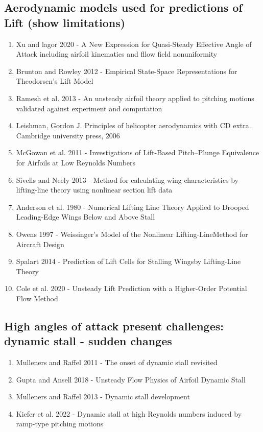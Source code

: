 \documentclass[%
 reprint,
 amsmath,amssymb,
 aps,
]{revtex4-2}
\begin{document}
\subsection{Aerodynamic models used for predictions of Lift (show limitations)}
\begin{enumerate}
    \item Xu and lagor 2020 - A New Expression for Quasi-Steady Effective Angle of Attack including airfoil kinematics and fllow field nonuniformity
    \item Brunton and Rowley 2012 - Empirical State-Space Representations
for Theodorsen’s Lift Model
    \item Ramesh et al. 2013 - An unsteady airfoil theory applied to pitching motions
validated against experiment and computation
    \item Leishman, Gordon J. Principles of helicopter aerodynamics with CD extra. Cambridge university press, 2006
    \item McGowan et al. 2011 - Investigations of Lift-Based Pitch–Plunge Equivalence
    for Airfoils at Low Reynolds Numbers
    
    \item Sivells and Neely 2013 - Method for calculating wing characteristics by lifting-line theory using nonlinear section lift data
    \item Anderson et al. 1980 - Numerical Lifting Line Theory Applied to Drooped Leading-Edge Wings Below and Above Stall
    \item Owens 1997 - Weissinger’s Model of the Nonlinear Lifting-LineMethod for Aircraft Design
    \item Spalart 2014 - Prediction of Lift Cells for Stalling Wingsby Lifting-Line Theory
    \item Cole et al. 2020 - Unsteady Lift Prediction with a Higher-Order Potential Flow Method
\end{enumerate}

\subsection{High angles of attack present challenges: dynamic stall - sudden changes}
\begin{enumerate}
    \item Mulleners and Raffel 2011 - The onset of dynamic stall revisited
    \item Gupta and Ansell 2018 - Unsteady Flow Physics of Airfoil Dynamic Stall
    \item Mulleners and Raffel 2013 - Dynamic stall development
    \item Kiefer et al. 2022 - Dynamic stall at high Reynolds numbers induced
    by ramp-type pitching motions
 \end{enumerate}
\end{document}
